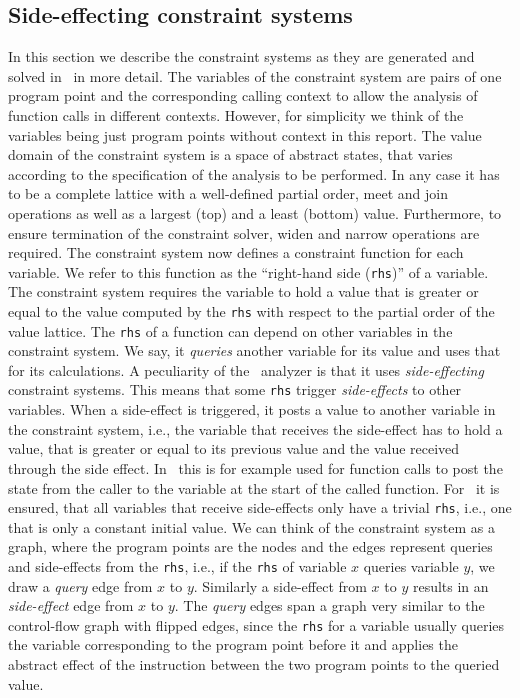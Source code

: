   \subsection{Side-effecting constraint systems}
  \label{sec:background:constrSys}
  In this section we describe the constraint systems as they are generated and solved in \gob\ in more detail. The variables of the constraint system are pairs of one program point and the corresponding calling context to allow the analysis of function calls in different contexts. However, for simplicity we think of the variables being just program points without context in this report. %
  The value domain of the constraint system is a space of abstract states, that varies according to the specification of the analysis to be performed. In any case it has to be a complete lattice with a well-defined partial order, meet and join operations as well as a largest (top) and a least (bottom) value. Furthermore, to ensure termination of the constraint solver, widen and narrow operations are required.
  The constraint system now defines a constraint function for each variable. We refer to this function as the ``right-hand side (\texttt{rhs})'' of a variable. The constraint system requires the variable to hold a value that is greater or equal to the value computed by the \texttt{rhs} with respect to the partial order of the value lattice.
  The \texttt{rhs} of a function can depend on other variables in the constraint system. We say, it \textit{queries} another variable for its value and uses that for its calculations.
  A peculiarity of the \gob\ analyzer is that it uses \textit{side-effecting} constraint systems. This means that some \texttt{rhs} trigger \textit{side-effects} to other variables. When a side-effect is triggered, it posts a value to another variable in the constraint system, i.e., the variable that receives the side-effect has to hold a value, that is greater or equal to its previous value and the value received through the side effect. In \gob\ this is for example used for function calls to post the state from the caller to the variable at the start of the called function.
  For \gob\ it is ensured, that all variables that receive side-effects only have a trivial \texttt{rhs}, i.e., one that is only a constant initial value.
  We can think of the constraint system as a graph, where the program points are the nodes and the edges represent queries and side-effects from the \texttt{rhs}, i.e., if the \texttt{rhs} of variable $x$ queries variable $y$, we draw a \textit{query} edge from $x$ to $y$. Similarly a side-effect from $x$ to $y$ results in an \textit{side-effect} edge from $x$ to $y$. The \textit{query} edges span a graph very similar to the control-flow graph with flipped edges, since the \texttt{rhs} for a variable usually queries the variable corresponding to the program point before it and applies the abstract effect of the instruction between the two program points to the queried value.

